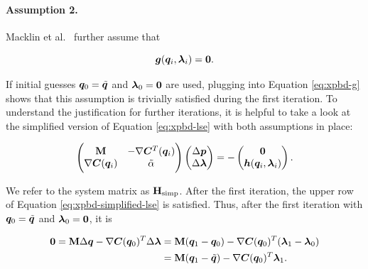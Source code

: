 \paragraph{Assumption 2.} Macklin et al.\ \cite{macklin2016} further assume that 

\begin{equation}\label{eq:xpbd-assumption-2}
    \bm{g}(\bm{q}_i, \bm{\lambda}_i) = \bm{0}. 
\end{equation}

\noindent If initial guesses
$\bm{q}_0 = \tilde{\bm{q}}$ and $\bm{\lambda}_0 = \bm{0}$ are used, plugging into Equation \ref{eq:xpbd-g} shows that this assumption is trivially
satisfied during the first iteration. To understand the justification for further iterations, it is helpful to take a look at the simplified
version of Equation \ref{eq:xpbd-lse} with both assumptions in place:

\begin{equation}\label{eq:xpbd-simplified-lse}
    \begin{pmatrix}
        \mathbf{M} & -\nabla\bm{C}^T(\bm{q}_i) \\
        \nabla \bm{C}(\bm{q}_i) & \tilde{\mathbf{\alpha}}
    \end{pmatrix}
    \begin{pmatrix}
        \Delta \bm{p} \\
        \Delta \bm{\lambda}
    \end{pmatrix}
    = -
    \begin{pmatrix}
    \bm{0} \\
    \bm{h}(\bm{q}_i, \bm{\lambda}_i)
    \end{pmatrix}.
\end{equation}

\noindent We refer to the system matrix as $\mathbf{H}_{\text{simp}}$. After the first iteration, the upper row of Equation \ref{eq:xpbd-simplified-lse} 
is satisfied. Thus, after the first iteration with $\bm{q}_0 = \tilde{\bm{q}}$ and $\bm{\lambda}_0 = \bm{0}$, it is

\begin{equation}
\begin{split}
    \bm{0} = \mathbf{M}\Delta\bm{q} - \nabla \bm{C}(\bm{q}_0)^T \Delta \bm{\lambda} &= \mathbf{M}(\bm{q}_1 - \bm{q}_0) - \nabla \bm{C}(\bm{q}_0)^T 
    (\bm{\lambda}_1 - \bm{\lambda}_0) \\
    &= \mathbf{M}(\bm{q}_1 - \tilde{\bm{q}}) - \nabla \bm{C}(\bm{q}_0)^T \bm{\lambda}_1. \label{eq:xpbd-assumption-2-detail}
\end{split}
\end{equation}

